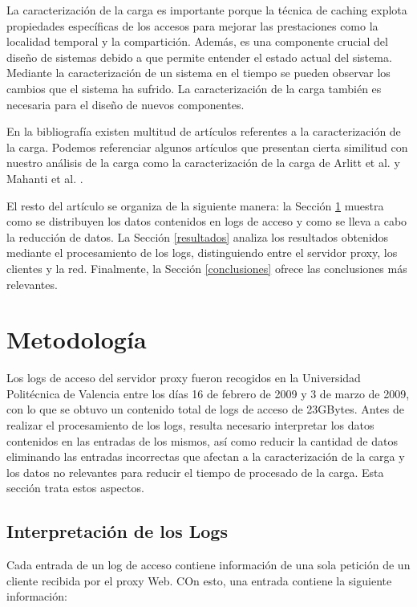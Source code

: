 \documentclass[twocolumn,twoside]{Jornadas}
\begin{document}
La caracterización de la carga es importante porque la técnica de caching explota propiedades específicas de los accesos para mejorar las prestaciones como la localidad temporal y la compartición. Además, es una componente crucial del diseño de sistemas debido a que permite entender el estado actual del sistema. Mediante la caracterización de un sistema en el tiempo se pueden observar los cambios que el sistema ha sufrido. La caracterización de la carga también es necesaria para el diseño de nuevos componentes.

En la bibliografía existen multitud de artículos referentes a la caracterización de la carga. Podemos referenciar algunos artículos que presentan cierta similitud con nuestro análisis de la carga como la caracterización de la carga de Arlitt et al. \cite{arlitt} y Mahanti et al. \cite{mahanti}.

El resto del artículo se organiza de la siguiente manera: la
Sección \ref{meto} muestra como se distribuyen los datos contenidos en logs de acceso y como se lleva a cabo la reducción de datos. La Sección \ref{resultados} analiza los resultados
obtenidos mediante el procesamiento de los logs, distinguiendo entre el servidor proxy, los clientes y la red. Finalmente, la Sección \ref{conclusiones} ofrece las conclusiones más relevantes.

\section{Metodología}
\label{meto}

Los logs de acceso del servidor proxy fueron recogidos en la Universidad Politécnica de Valencia entre los días 16 de febrero de 2009 y 3 de marzo de 2009, con lo que se obtuvo un contenido total de logs de acceso de 23GBytes. Antes de realizar el procesamiento de los logs, resulta necesario interpretar los datos contenidos en las entradas de los mismos, así como reducir la cantidad de datos eliminando las entradas incorrectas que afectan a la caracterización de la carga y los datos no relevantes para reducir el tiempo de procesado de la carga. Esta sección trata estos aspectos.

\subsection{Interpretación de los Logs}

Cada entrada de un log de acceso contiene información de una sola petición de un cliente recibida por el proxy Web. COn esto, una entrada contiene la siguiente información:
\end{document}
